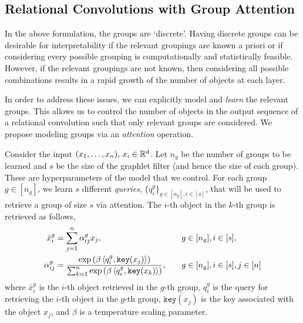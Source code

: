 \subsection{Relational Convolutions with Group Attention}\label{ssec:relconv_groupattn}

In the above formulation, the groups are `discrete'. Having discrete groups can be desirable for interpretability if the relevant groupings are known a priori or if considering every possible grouping is computationally and statistically feasible. However, if the relevant groupings are not known, then considering all possible combinations results in a rapid growth of the number of objects at each layer.

In order to address these issues, we can explicitly model and \textit{learn} the relevant groups. This allows us to control the number of objects in the output sequence of a relational convolution such that only relevant groups are considered. We propose modeling groups via an \textit{attention} operation.

Consider the input $(x_1, \ldots, x_n),\, x_i \in \mathbb{R}^d$. Let $n_g$ be the number of groups to be learned and $s$ be the size of the graphlet filter (and hence the size of each group). These are hyperparameters of the model that we control.
For each group $g \in [n_g]$, we learn $s$ different \textit{queries}, $\{q_{i}^{g}\}_{g \in [n_g], i \in [s]}$, that will be used to retrieve a group of size $s$ via attention. The $i$-th object in the $k$-th group is retrieved as follows,
\begin{equation}\label{eq:group_attn}
    \begin{aligned}
        \bar{x}_{i}^{g} &= \sum_{j = 1}^{n} \alpha_{ij}^{g} x_j, && g \in [n_g], i \in [s],\\
        \alpha_{ij}^{g} &= \frac{\exp\left(\beta \left \langle q_i^g, \mathtt{key}(x_j) \right\rangle\right)}{\sum_{k = 1}^{n}{\exp\left(\beta \left \langle q_i^g, \mathtt{key}(x_k) \right\rangle\right)}}, \quad && g \in [n_g], i \in [s], j \in [n]
    \end{aligned}
\end{equation}
where $\bar{x}_{i}^{g}$ is the $i$-th object retrieved in the $g$-th group, $q_{i}^{g}$ is the query for retrieving the $i$-th object in the $g$-th group, $\mathtt{key}(x_j)$ is the key associated with the object $x_j$, and $\beta$ is a temperature scaling parameter.

